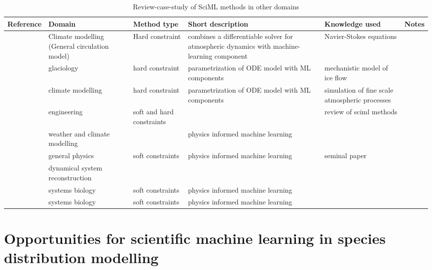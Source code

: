 \begin{table}[htbp]
\centering
\caption{Review-case-study of SciML methods in other domains}
\small
\begin{tabular}{@{}p{2cm}>{\raggedright\arraybackslash}p{2.5cm}>{\raggedright\arraybackslash}p{2cm}>{\raggedright\arraybackslash}p{3cm}>{\raggedright\arraybackslash}p{2.5cm}>{\raggedright\arraybackslash}p{2cm}@{}}
\toprule
\textbf{Reference} & \textbf{Domain} & \textbf{Method type} & \textbf{Short description} & \textbf{Knowledge used} & \textbf{Notes} \\
\midrule
\cite{kochkov2024} & Climate modelling (General circulation model) & Hard constraint & combines a differentiable solver for atmospheric dynamics with machine-learning component & Navier-Stokes equations \\
\cite{bolibar2023} & glaciology & hard constraint & parametrization of ODE model with ML components & mechanistic model of ice flow & \\
\cite{rasp2018} & climate modelling & hard constraint  & parametrization of ODE model with ML components & simulation of fine scale atmospheric processes & \\
\cite{Willard2020} & engineering & soft and hard constraints & & review of sciml methods\\
\cite{Kashinath2021} & weather and climate modelling & & physics informed machine learning & \\
\cite{Raissi2019} & general physics & soft constraints & physics informed machine learning & seminal paper \\
\cite{brenner2024} & dynamical system reconstruction \\
\cite{lagergren2020} & systems biology & soft constraints & physics informed machine learning \\
\cite{Yazdani2020} & systems biology & soft constraints & physics informed machine learning \\
\bottomrule
\end{tabular}
\end{table}



\section{Opportunities for scientific machine learning in species distribution modelling}


